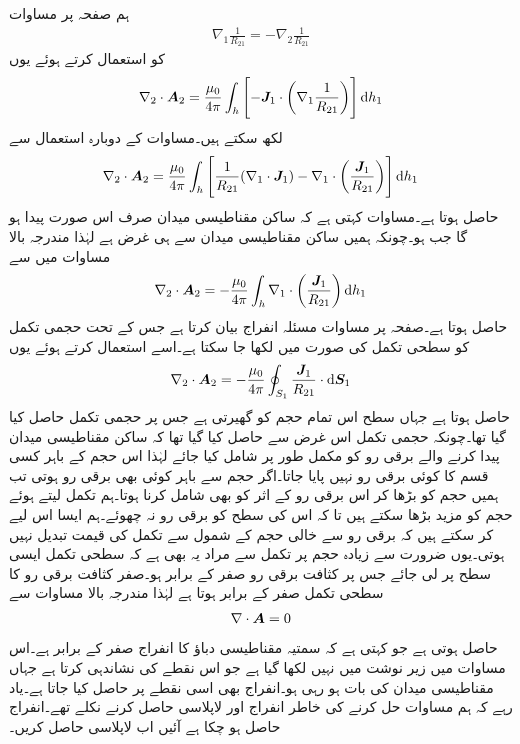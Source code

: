 ہم صفحہ  پر مساوات 
\begin{align*}
\nabla_1 \frac{1}{R_{21}}=-\nabla_2 \frac{1}{R_{21}}
\end{align*}
کو استعمال کرتے ہوئے یوں 
\begin{align}
\nabla_2 \cdot \kvec{A}_2=\frac{\mu_0}{4\pi}\int_h \left[-\kvec{J}_1 \cdot \left(\nabla_1 \frac{1}{R_{21}}\right)\right] \dif h_1
\end{align}
لکھ سکتے ہیں۔مساوات  کے دوبارہ استعمال سے 
\begin{align}
\nabla_2 \cdot \kvec{A}_2=\frac{\mu_0}{4\pi}\int_h \left[\frac{1}{R_{21}} (\nabla_1 \cdot \kvec{J}_1)-\nabla_1 \cdot \left(\frac{\kvec{J}_1}{R_{21}} \right)\right] \dif h_1
\end{align}
حاصل ہوتا ہے۔مساوات  کہتی ہے کہ ساکن مقناطیسی میدان صرف اس صورت پیدا ہو گا جب  ہو۔چونکہ ہمیں ساکن مقناطیسی میدان سے ہی غرض ہے لہٰذا مندرجہ بالا مساوات میں سے
\begin{align}
\nabla_2 \cdot \kvec{A}_2=-\frac{\mu_0}{4\pi}\int_h \nabla_1 \cdot \left(\frac{\kvec{J}_1}{R_{21}} \right) \dif h_1
\end{align}
حاصل ہوتا ہے۔صفحہ  پر مساوات  مسئلہ انفراج بیان کرتا ہے جس کے تحت حجمی تکمل کو سطحی تکمل کی صورت میں لکھا جا سکتا ہے۔اسے استعمال کرتے ہوئے یوں
\begin{align}
\nabla_2 \cdot \kvec{A}_2=-\frac{\mu_0}{4\pi}\oint_{S_1} \frac{\kvec{J}_1}{R_{21}} \cdot \dif \kvec{S}_1
\end{align}
حاصل ہوتا ہے جہاں سطح  اس تمام حجم کو گھیرتی ہے جس پر حجمی تکمل حاصل کیا گیا تھا۔چونکہ حجمی تکمل اس غرض سے حاصل کیا گیا تھا کہ ساکن مقناطیسی میدان پیدا کرنے والے برقی رو کو مکمل طور پر شامل کیا جائے  لہٰذا اس حجم کے باہر کسی قسم کا کوئی برقی رو نہیں پایا جاتا۔اگر حجم سے باہر کوئی بھی برقی رو ہوتی تب ہمیں حجم کو بڑھا کر اس برقی رو کے اثر کو بھی شامل کرنا ہوتا۔ہم تکمل لیتے ہوئے حجم کو مزید بڑھا سکتے ہیں تا کہ اس کی سطح کو برقی رو نہ چھوئے۔ہم ایسا اس لیے کر سکتے ہیں کہ برقی رو سے خالی حجم کے شمول سے تکمل کی قیمت تبدیل نہیں ہوتی۔یوں ضرورت سے زیادہ حجم پر تکمل سے مراد یہ بھی ہے کہ سطحی تکمل ایسی سطح پر لی جائے جس پر کثافت برقی رو صفر کے برابر ہو۔صفر کثافت برقی رو کا سطحی تکمل صفر کے برابر ہوتا ہے لہٰذا مندرجہ بالا مساوات سے
\begin{align}\label{مساوات_مقناطیسی_سمتی_مقناطیسی_دباو_کی_پھیلاو_صفر_ہے}
\nabla \cdot {\ensuremath{{\boldsymbol{A}}}}=0
\end{align}
حاصل ہوتی ہے جو کہتی ہے کہ سمتیہ مقناطیسی دباؤ کا انفراج صفر کے برابر ہے۔اس مساوات میں زیر نوشت میں  نہیں لکھا گیا ہے جو اس نقطے کی نشاندہی کرتا ہے جہاں مقناطیسی میدان کی بات ہو رہی ہو۔انفراج بھی اسی نقطے پر حاصل کیا جاتا ہے۔یاد رہے کہ ہم مساوات  حل کرنے کی خاطر انفراج اور لاپلاسی حاصل کرنے نکلے تھے۔انفراج حاصل ہو چکا ہے آئیں اب لاپلاسی حاصل کریں۔  


